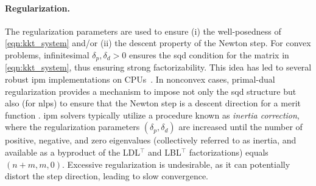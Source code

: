 \documentclass{article}
\begin{document}
\paragraph{Regularization.}
The regularization parameters are used to ensure (i) the well-posedness of \cref{eqn:kkt_system} and/or (ii) the descent property of the Newton step. For convex problems, infinitesimal $\delta_p, \delta_d > 0$ ensures the \gls*{sqd} condition for the matrix in \cref{eqn:kkt_system}, thus ensuring strong factorizability. This idea has led to several robust \gls*{ipm} implementations on CPUs~\cite{friedlanderPrimalDualRegularized2012}. In nonconvex cases, primal-dual regularization provides a mechanism to impose not only the \gls*{sqd} structure but also (for \glspl*{nlp}) to ensure that the Newton step is a descent direction for a merit function \cite{wachterImplementationInteriorpointFilter2006}. \Gls*{ipm} solvers typically utilize a procedure known as \emph{inertia correction}, where the regularization parameters $(\delta_p, \delta_d)$ are increased until the number of positive, negative, and zero eigenvalues (collectively referred to as inertia, and available as a byproduct of the LDL$^\top$ and LBL$^\top$ factorizations) equals $(n+m, m, 0)$. Excessive regularization is undesirable, as it can potentially distort the step direction, leading to slow convergence.
\end{document}
